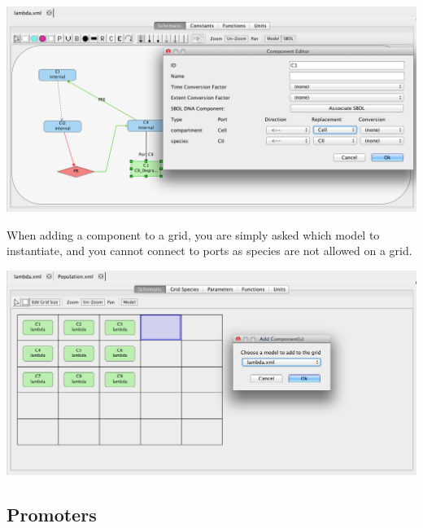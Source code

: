 \documentclass[titlepage,11pt]{article}
\begin{document}
\begin{center}
\includegraphics[width=160mm]{screenshots/editComp}
\end{center}

When adding a component to a grid, you are simply asked which model to instantiate, and you cannot connect to ports as species are not allowed on a grid.

\begin{center}
\includegraphics[width=160mm]{screenshots/addCompGrid}
\end{center}

\subsection{\label{Promoters}Promoters}
\end{document}
